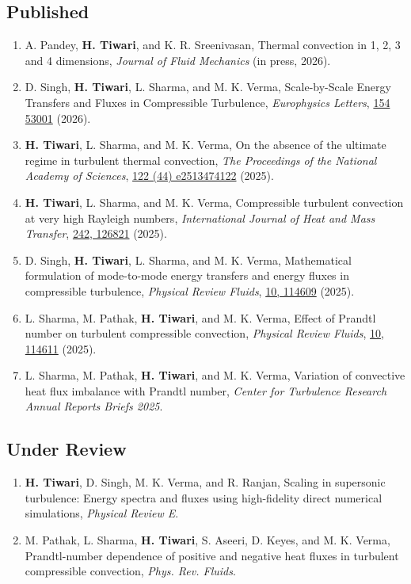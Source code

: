 \documentclass[10pt,a4paper]{article}
\begin{document}
\subsection*{Published}
\begin{enumerate}[leftmargin=1.5em, itemsep=3pt, parsep=0pt]
  \item A. Pandey, \textbf{H. Tiwari}, and K. R. Sreenivasan, Thermal convection in 1, 2, 3 and 4 dimensions, \textit{Journal of Fluid Mechanics} (in press, 2026).
  \item D. Singh, \textbf{H. Tiwari}, L. Sharma, and M. K. Verma, Scale-by-Scale Energy Transfers and Fluxes in Compressible Turbulence, \textit{Europhysics Letters}, \underline{154 53001} (2026).
  \item \textbf{H. Tiwari}, L. Sharma, and M. K. Verma, On the absence of the ultimate regime in turbulent thermal convection, \textit{The Proceedings of the National Academy of Sciences}, \underline{122 (44) e2513474122} (2025).
  \item \textbf{H. Tiwari}, L. Sharma, and M. K. Verma, Compressible turbulent convection at very high Rayleigh numbers, \textit{International Journal of Heat and Mass Transfer}, \underline{242, 126821} (2025).
  \item D. Singh, \textbf{H. Tiwari}, L. Sharma, and M. K. Verma, Mathematical formulation of mode-to-mode energy transfers and energy fluxes in compressible turbulence, \textit{Physical Review Fluids}, \underline{10, 114609} (2025).
  \item L. Sharma, M. Pathak, \textbf{H. Tiwari}, and M. K. Verma, Effect of Prandtl number on turbulent compressible convection, \textit{Physical Review Fluids}, \underline{10, 114611} (2025).
  \item L. Sharma, M. Pathak, \textbf{H. Tiwari}, and M. K. Verma, Variation of convective heat flux imbalance with Prandtl number, \textit{Center for Turbulence Research Annual Reports Briefs 2025}.
\end{enumerate}

\subsection*{Under Review}
\begin{enumerate}[leftmargin=1.5em, itemsep=3pt, parsep=0pt]
  \item \textbf{H. Tiwari}, D. Singh, M. K. Verma, and R. Ranjan, Scaling in supersonic turbulence: Energy spectra and fluxes using high-fidelity direct numerical simulations, \textit{Physical Review E}.
  \item M. Pathak, L. Sharma, \textbf{H. Tiwari}, S. Aseeri, D. Keyes, and M. K. Verma, Prandtl-number dependence of positive and negative heat fluxes in turbulent compressible convection, \textit{Phys. Rev. Fluids}.
\end{enumerate}
\end{document}
